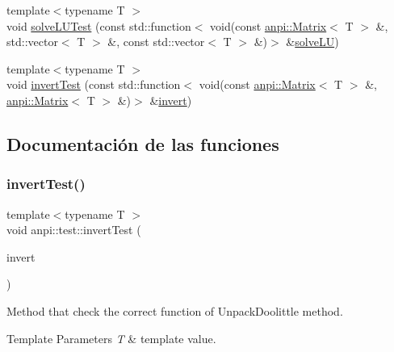 \begin{DoxyCompactItemize}
\item 
{\footnotesize template$<$typename T $>$ }\\void \hyperlink{namespaceanpi_1_1test_a48305a842ca50e8175b4baa93d9fc70e}{solve\+L\+U\+Test} (const std\+::function$<$ void(const \hyperlink{classanpi_1_1Matrix}{anpi\+::\+Matrix}$<$ T $>$ \&, std\+::vector$<$ T $>$ \&, const std\+::vector$<$ T $>$ \&)$>$ \&\hyperlink{namespaceanpi_a6764a07c6b16cedf0489a10e2650cc51}{solve\+LU})
\item 
{\footnotesize template$<$typename T $>$ }\\void \hyperlink{namespaceanpi_1_1test_a0befe6c5f1dbc4854338935efe425d06}{invert\+Test} (const std\+::function$<$ void(const \hyperlink{classanpi_1_1Matrix}{anpi\+::\+Matrix}$<$ T $>$ \&, \hyperlink{classanpi_1_1Matrix}{anpi\+::\+Matrix}$<$ T $>$ \&)$>$ \&\hyperlink{namespaceanpi_a7b13e1af574b2eb816cb8f65cc2e6c56}{invert})
\end{DoxyCompactItemize}


\subsection{Documentación de las funciones}
\mbox{\label{namespaceanpi_1_1test_aacf0f9fee77d3af9798f523f4230d8bf}} 
\subsubsection{\texorpdfstring{invert\+Test()}{invertTest()}\hspace{0.1cm}{\footnotesize\ttfamily [1/2]}}
{\footnotesize\ttfamily template$<$typename T $>$ \\
void anpi\+::test\+::invert\+Test (\begin{DoxyParamCaption}\item[{const std\+::function$<$ void(const \hyperlink{classanpi_1_1Matrix}{Matrix}$<$ T $>$ \&A, \hyperlink{classanpi_1_1Matrix}{Matrix}$<$ T $>$ \&Ai)$>$ \&}]{invert }\end{DoxyParamCaption})}



Method that check the correct function of Unpack\+Doolittle method. 


\begin{DoxyTemplParams}{Template Parameters}
{\em T} & template value. \\
\hline
\end{DoxyTemplParams}

